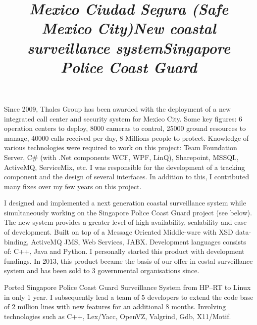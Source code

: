 \documentclass[overlapped,line,letterpaper]{res}
\begin{document}
\begin{resume}
  \title{\em Mexico Ciudad Segura (Safe Mexico City)}
  \begin{position}
    Since 2009, Thales Group has been awarded with the deployment of a new
    integrated call center and security system for Mexico City. Some key
    figures: 6 operation centers to deploy, 8000 cameras to control, 25000
    ground resources to manage, 40000 calls received per day, 8 Millions people
    to protect. Knowledge of various technologies were required to work on this
    project: Team Foundation Server, C\# (with .Net components WCF, WPF, LinQ),
    Sharepoint, MSSQL, ActiveMQ, ServiceMix, etc. I was responsible for the
    development of a tracking component and the design of several interfaces. In
    addition to this, I contributed many fixes over my few years on this project.
  \end{position}

  \title{\em New coastal surveillance system}
  \begin{position}
    I designed and implemented a next generation coastal surveillance system
    while simultaneously working on the Singapore Police Coast Guard project
    (see below). The new system provides a greater level of high-availability,
    scalability and ease of development. Built on top of a Message Oriented
    Middle-ware with XSD data-binding, ActiveMQ JMS, Web Services,
    JABX. Development languages consists of: C++, Java and Python. I personally
    started this product with development fundings. In 2013, this product became
    the basis of our offer in costal surveillance system and has been sold to 3
    governmental organisations since.
  \end{position}

  \title{\em Singapore Police Coast Guard}
  \begin{position}
    Ported Singapore Police Coast Guard Surveillance System from HP--RT to Linux
    in only 1 year. I subsequently lead a team of 5 developers to extend the code
    base of 2 million lines with new features for an additional 8 months.
    Involving technologies such as C++, Lex/Yacc, OpenVZ, Valgrind, Gdb,
    X11/Motif.
  \end{position}



\end{resume}
\end{document}
